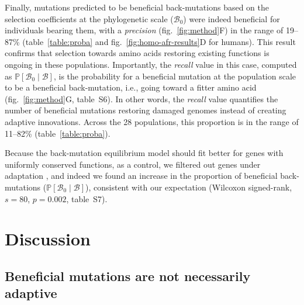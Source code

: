 \documentclass{article}
\newcommand{\proba}{\mathbb{P}}
\newcommand{\SphyBen}{\mathcal{B}_0}
\newcommand{\given}{\mid}
\newcommand{\SpopBen}{\mathcal{B}}
\begin{document}
    Finally, mutations predicted to be beneficial back-mutations based on the selection coefficients at the phylogenetic scale ($\SphyBen$) were indeed beneficial for individuals bearing them, with a \textit{precision} (fig.~\ref{fig:method}F) in the range of 19--87\% (table~\ref{table:proba} and fig.~\ref{fig:homo-afr-results}D for humans).
    This result confirms that selection towards amino acids restoring existing functions is ongoing in these populations.
    Importantly, the \textit{recall} value in this case, computed as $\proba [ \SphyBen  \given  \SpopBen]$, is the probability for a beneficial mutation at the population scale to be a beneficial back-mutation, i.e., going toward a fitter amino acid (fig.~\ref{fig:method}G, table~S6).
    In other words, the \textit{recall} value quantifies the number of beneficial mutations restoring damaged genomes instead of creating adaptive innovations.
    Across the 28 populations, this proportion is in the range of 11--82\% (table~\ref{table:proba}).

    Because the back-mutation equilibrium model should fit better for genes with uniformly conserved functions, as a control, we filtered out genes under adaptation \cite{latrille_genes_2023}, and indeed we found an increase in the proportion of beneficial back-mutations ($\proba [ \SphyBen  \given  \SpopBen]$), consistent with our expectation (Wilcoxon signed-rank, $s=80$, $p=0.002$, table~S7).

    \section*{Discussion}
    \subsection*{Beneficial mutations are not necessarily adaptive}
\end{document}
